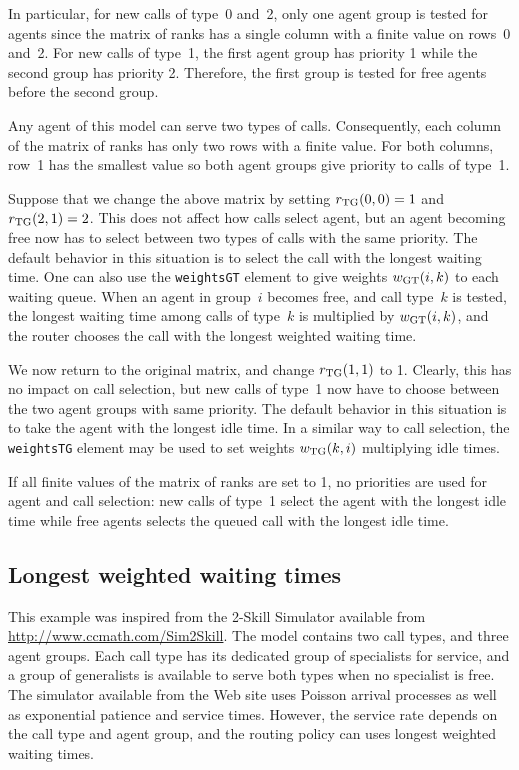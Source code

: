 In particular, for
new calls of type~0 and~2, only one agent group is tested for agents
since the matrix of ranks has a single column with a finite value on
rows~0 and~2.
For new calls of type~1, the first agent group has priority 1 while
the second group has priority 2.  Therefore, the first group is tested
for free agents before the second group.

Any agent of this model can serve two types of calls.
Consequently, each column of the matrix of ranks has only two rows
with a finite value.
For both columns, row~1 has the smallest value so both agent groups
give priority to calls of type~1.

Suppose that we change the above matrix by
setting $\rTG(0,0)=1$ and $\rTG(2,1)=2$.
This does not affect how calls select agent, but an agent becoming
free now has to select between two types of calls with the same
priority.
The default behavior in this situation is to select the call with the
longest waiting time.
One can also use the \texttt{weightsGT} element to give weights
$w_{\mathrm{GT}}(i,k)$ to each waiting queue.
When an agent in group~$i$ becomes free, and call type~$k$ is tested,
the longest waiting time among calls of type~$k$ is multiplied by
$w_{\mathrm{GT}}(i,k)$, and the router chooses the call with the longest weighted
waiting time.

We now return to the original matrix, and change
$\rTG(1,1)$ to 1.  Clearly, this has no impact on call selection, but
new calls of type~1 now have to choose between the two agent groups
with same priority.  The default behavior in this situation is to take
the agent with the longest idle time.
In a similar way to call selection, the \texttt{weightsTG} element may
be used to set weights $w_{\mathrm{TG}}(k,i)$ multiplying idle times.

If all finite values of the matrix of ranks are set to 1, no
priorities are used for agent and call selection: new calls of type~1
select the agent with the longest idle time while free agents selects
the queued call with the longest idle time.

\subsection{Longest weighted waiting times}
\label{sec:sim2skill}

This example was inspired from the 2-Skill Simulator available from
\url{http://www.ccmath.com/Sim2Skill}.
The model contains two call types, and three agent groups.  Each call
type has its dedicated group of specialists for service, and a group
of generalists is available to serve both types when no specialist is
free.
The simulator available from the Web site uses Poisson arrival
processes as well as exponential patience and service times.  However,
the service rate depends on the call type and agent group, and the
routing policy can uses longest weighted waiting times.

